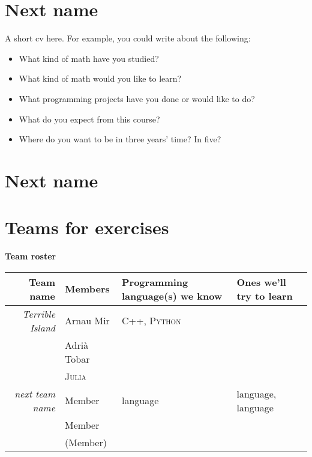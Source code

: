 \documentclass[11pt]{amsart}
\begin{document}
\section*{Next name}

A short cv here. For example, you could write about the following:

\begin{itemize}
\item What kind of math have you studied?
\item What kind of math would you like to learn?
\item What programming projects have you done or would like to do?
\item What do you expect from this course?
\item Where do you want to be in three years' time? In five?
\end{itemize}


\medskip

\section*{Next name}


\newpage
\section*{Teams for exercises}

\begin{center}
  \textbf{\sffamily Team roster}
\end{center}

\bigskip
\begin{center}
  \begin{tabular}[c]{r|l|l|l}
    Team name
    & Members
    & Programming language(s) we know
    & Ones we'll try to learn
    \\\hline
    \emph{Terrible Island}
     & Arnau Mir
      & \textsc{C++}, \textsc{Python}  \\
      & Adrià Tobar & \\
      &  \textsc{Julia}&  
               
    \\\hline
    \emph{next team name}
    & Member
    & language  & language, language  \\
    & Member \\
    & (Member)                
    
  \end{tabular}
\end{center}
\end{document}
